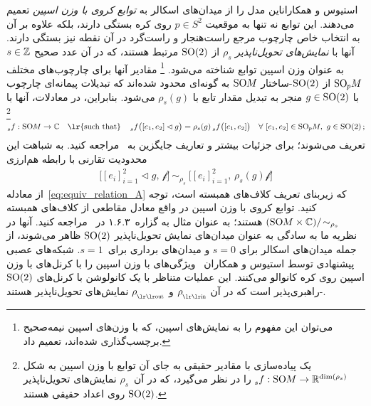 استیوس و همکاران\cite{esteves2020spinweighted}این مدل را از میدان‌های اسکالر به \emph{توابع کروی با وزن اسپین} تعمیم می‌دهند.
این توابع نه تنها به موقعیت $p\in S^2$ روی کره بستگی دارند، بلکه علاوه بر آن به انتخاب خاص چارچوب مرجع راست‌هنجار و راست‌گرد در آن نقطه نیز بستگی دارند.
آنها با \emph{نمایش‌های تحویل‌ناپذیر} $\rho_s$ از $\operatorname{SO}(2)$ مرتبط هستند، که در آن عدد صحیح $s\in\mathbb{Z}$ به عنوان وزن اسپین توابع شناخته می‌شود.%
\footnote{
	می‌توان این مفهوم را به نمایش‌های اسپین، که با وزن‌های اسپین نیمه‌صحیح برچسب‌گذاری شده‌اند، تعمیم داد.
}
مقادیر آنها برای چارچوب‌های مختلف $\operatorname{SO}_{\mkern-1.1mu p}\mkern-3.2muM$ از $\operatorname{SO}(2)$-ساختار $\operatorname{SO}\mkern-3.6muM$ به گونه‌ای محدود شده‌اند که تبدیلات پیمانه‌ای چارچوب با $g\in\operatorname{SO}(2)$ منجر به تبدیل مقدار تابع با $\rho_s(g)$ می‌شود.
بنابراین، در معادلات، آنها با%
\footnote{
	یک پیاده‌سازی با مقادیر حقیقی به جای آن توابع با وزن اسپین به شکل $\prescript{}{s}f: \operatorname{SO}\mkern-3.6muM \to \mathbb{R}^{\dim(\rho_s)}$ را در نظر می‌گیرد، که در آن~$\rho_s$ نمایش‌های تحویل‌ناپذیر $\operatorname{SO}(2)$ روی اعداد حقیقی هستند.
}
\begin{align}
	\prescript{}{s}f: \SOM \to \Cm
	\ \ \ \textup{\lr{such that}} \ \ \
	\prescript{}{s}f\big( [e_1,e_2] \lhd g \big) = \rho_s(g) \prescript{}{s}f \big( [e_1,e_2] \big)
	\ \ \ \forall\ [e_1,e_2] \in \SOpM,\ g\in\SO2 \,;\!
\end{align}
تعریف می‌شوند؛ برای جزئیات بیشتر و تعاریف جایگزین به~\cite{boyle2016should} مراجعه کنید.
به شباهت این محدودیت تقارنی با رابطه هم‌ارزی
\begin{align}
	\big[ [e_i]_{i=1}^2 \lhd g,\, \mathscr{f} \big]\ \sim_{\rho_s}\ \big[ [e_i]_{i=1}^2,\, \rho_s(g) \mathscr{f} \big]
\end{align}
از معادله~\eqref{eq:equiv_relation_A} که زیربنای تعریف کلاف‌های همبسته است، توجه کنید.
توابع کروی با وزن اسپین در واقع معادل مقاطعی از کلاف‌های همبسته
$(\operatorname{SO}\mkern-3.6muM \times \mathbb{C})/\!\sim_{\rho_s}$ هستند؛
به عنوان مثال به گزاره~۱.۶.۳ در~\cite{wendlLectureNotesBundles2008} مراجعه کنید.
آنها در نظریه ما به سادگی به عنوان میدان‌های نمایش تحویل‌ناپذیر $\operatorname{SO}(2)$ ظاهر می‌شوند، از جمله میدان‌های اسکالر برای $s=0$ و میدان‌های برداری برای~$s=1$.
شبکه‌های عصبی پیشنهادی توسط استیوس و همکاران~\cite{esteves2020spinweighted} ویژگی‌های با وزن اسپین را با کرنل‌های با وزن اسپین روی کره کانوالو می‌کنند.
این عملیات متناظر با یک کانولوشن با کرنل‌های $\operatorname{SO}(2)$-راهبری‌پذیر است که در آن $\rhoin$ و $\rhoout$ نمایش‌های تحویل‌ناپذیر هستند.


